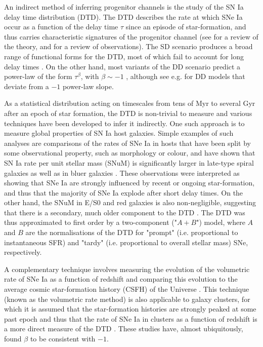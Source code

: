 \documentclass[fleqn,usenatbib]{mnras}
\begin{document}
An indirect method of inferring progenitor channels is the study of the SN Ia delay time distribution (DTD). The DTD describes the rate at which SNe Ia occur as a function of the delay time $\tau$ since an episode of star-formation, and thus carries characteristic signatures of the progenitor channel (see \citealt{Wang2012} for a review of the theory, and \citealt{Maoz2017} for a review of observations). The SD scenario produces a broad range of functional forms for the DTD, most of which fail to account for long delay times \citep{Graur2014}. On the other hand, most variants of the DD scenario predict a power-law of the form $\tau^{\beta}$, with $\beta \sim -1$ \citep[e.g][]{Ruiter2009,Mennekens2010}, although see e.g.  \citet{Yungelson2017} for DD models that deviate from a $-1$ power-law slope.

As a statistical distribution acting on timescales from tens of Myr to several Gyr after an epoch of star formation, the DTD is non-trivial to measure and various techniques have been developed to infer it indirectly. One such approach is to measure global properties of SN Ia host galaxies. Simple examples of such analyses are comparisons of the rates of SNe Ia in hosts that have been split by some observational property, such as morphology or colour, and have shown that SN Ia rate per unit stellar mass (SNuM) is significantly larger in late-type spiral galaxies as well as in bluer galaxies \citep[e.g.][]{Mannucci2005}. These observations were interpreted as showing that SNe Ia are strongly influenced by recent or ongoing star-formation, and thus that the majority of SNe Ia explode after short delay times. On the other hand, the SNuM in E/S0 and red galaxies is also non-negligible, suggesting that there is a secondary, much older component to the DTD \citep{Sullivan2006,Li2011a,Smith2012}. The DTD was thus approximated to first order by a two-component ("$A + B$") model, where $A$ and $B$ are the normalisations of the DTD for "prompt" (i.e. proportional to instantaneous SFR) and "tardy" (i.e. proportional to overall stellar mass) SNe, respectively.

A complementary technique involves measuring the evolution of the volumetric rate of SNe Ia as a function of redshift and comparing this evolution to the average cosmic star-formation history (CSFH) of the Universe \citep{Gal-Yam2004,Strolger2004,Dahlen2004,Dahlen2008, Graur2011,Graur2013, Rodney2014,Frohmaier2019}. This technique (known as the volumetric rate method) is also applicable to galaxy clusters, for which it is assumed that the star-formation histories are strongly peaked at some past epoch and thus that the rate of SNe Ia in clusters as a function of redshift is a more direct measure of the DTD \citep{Maoz2004,Maoz2010,Friedmann2018,Freundlich2021}. These studies have, almost ubiquitously, found $\beta$ to be consistent with $-1$.
\end{document}
